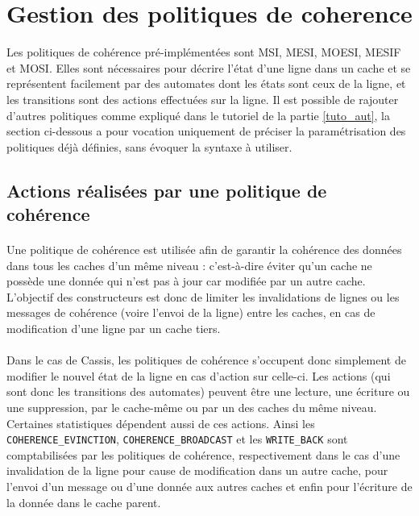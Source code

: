 \section{Gestion des politiques de coherence}

Les politiques de cohérence pré-implémentées sont MSI, MESI, MOESI, MESIF et MOSI. Elles sont nécessaires pour décrire l'état d'une ligne dans un cache et se représentent facilement par des automates dont les états sont ceux de la ligne, et les transitions sont des actions effectuées sur la ligne. Il est possible de rajouter d'autres politiques comme expliqué dans le tutoriel de la partie \ref{tuto_aut}, la section ci-dessous a pour vocation uniquement de préciser la paramétrisation des politiques déjà définies, sans évoquer la syntaxe à utiliser.

\subsection{Actions réalisées par une politique de cohérence}
\label{actions}

\paragraph{}
Une politique de cohérence est utilisée afin de garantir la cohérence des données dans tous les caches d'un même niveau : c'est-à-dire éviter qu'un cache ne possède une donnée qui n'est pas à jour car modifiée par un autre cache. L'objectif des constructeurs est donc de limiter les invalidations de lignes ou les messages de cohérence (voire l'envoi de la ligne) entre les caches, en cas de modification d'une ligne par un cache tiers. 

\paragraph{}
Dans le cas de \textsf{Cassis}, les politiques de cohérence s'occupent donc simplement de modifier le nouvel état de la ligne en cas d'action sur celle-ci. Les actions (qui sont donc les transitions des automates) peuvent être une lecture, une écriture ou une suppression, par le cache-même ou par un des caches du même niveau. Certaines statistiques dépendent aussi de ces actions. Ainsi les \verb!COHERENCE_EVINCTION!, \verb!COHERENCE_BROADCAST! et les \verb!WRITE_BACK! sont comptabilisées par les politiques de cohérence, respectivement dans le cas d'une invalidation de la ligne pour cause de modification dans un autre cache, pour l'envoi d'un message ou d'une donnée aux autres caches et enfin pour l'écriture de la donnée dans le cache parent. 

